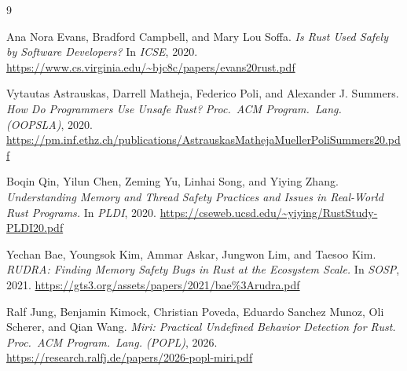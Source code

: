 \documentclass[11pt]{article}
\begin{document}
\begin{thebibliography}{9}

Ana Nora Evans, Bradford Campbell, and Mary Lou Soffa.
\newblock \emph{Is Rust Used Safely by Software Developers?}
\newblock In \emph{ICSE}, 2020.
\newblock \url{https://www.cs.virginia.edu/~bjc8c/papers/evans20rust.pdf}

Vytautas Astrauskas, Darrell Matheja, Federico Poli, and Alexander J. Summers.
\newblock \emph{How Do Programmers Use Unsafe Rust?}
\newblock \emph{Proc.\ ACM Program.\ Lang. (OOPSLA)}, 2020.
\newblock \url{https://pm.inf.ethz.ch/publications/AstrauskasMathejaMuellerPoliSummers20.pdf}

Boqin Qin, Yilun Chen, Zeming Yu, Linhai Song, and Yiying Zhang.
\newblock \emph{Understanding Memory and Thread Safety Practices and Issues in Real-World Rust Programs.}
\newblock In \emph{PLDI}, 2020.
\newblock \url{https://cseweb.ucsd.edu/~yiying/RustStudy-PLDI20.pdf}

Yechan Bae, Youngsok Kim, Ammar Askar, Jungwon Lim, and Taesoo Kim.
\newblock \emph{RUDRA: Finding Memory Safety Bugs in Rust at the Ecosystem Scale.}
\newblock In \emph{SOSP}, 2021.
\newblock \url{https://gts3.org/assets/papers/2021/bae%3Arudra.pdf}

Ralf Jung, Benjamin Kimock, Christian Poveda, Eduardo Sanchez Munoz, Oli Scherer, and Qian Wang.
\newblock \emph{Miri: Practical Undefined Behavior Detection for Rust.}
\newblock \emph{Proc.\ ACM Program.\ Lang. (POPL)}, 2026.
\newblock \url{https://research.ralfj.de/papers/2026-popl-miri.pdf}

\end{thebibliography}
\end{document}
